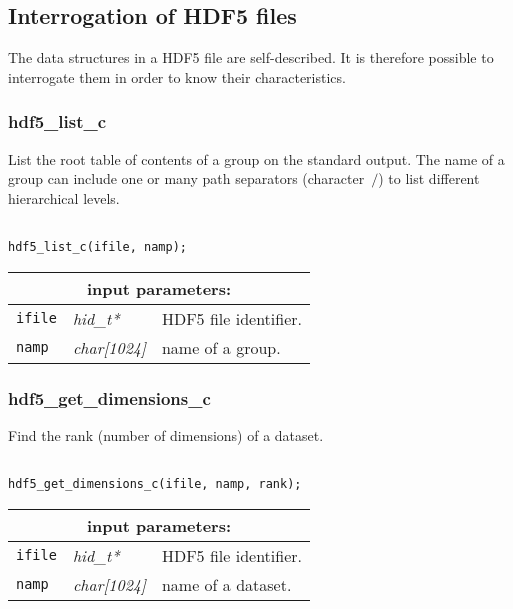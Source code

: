 \subsection{Interrogation of HDF5 files}

The data structures in a HDF5 file are self-described. It is therefore possible to interrogate them in order to know their characteristics.

\subsubsection{hdf5\_list\_c}

List the root table of contents of a group on the standard output. The name of a group can include one or many path separators (character~$\slash$)
to list different hierarchical levels.

\begin{verbatim}

hdf5_list_c(ifile, namp);
\end{verbatim}

\noindent
\begin{tabular}{|p{1.5cm}|p{2cm}|p{11cm}|}
\hline
\multicolumn{3}{|c|}{\bf input parameters:} \\
\hline
{\tt ifile} & {\it hid\_t*} & HDF5 file identifier. \\
\hline
{\tt namp} & {\it char[1024]} & name of a group. \\
\hline
\end{tabular}

\subsubsection{hdf5\_get\_dimensions\_c}

Find the rank (number of dimensions) of a dataset.

\begin{verbatim}

hdf5_get_dimensions_c(ifile, namp, rank);
\end{verbatim}

\noindent
\begin{tabular}{|p{1.5cm}|p{2cm}|p{11cm}|}
\hline
\multicolumn{3}{|c|}{\bf input parameters:} \\
\hline
{\tt ifile} & {\it hid\_t*} & HDF5 file identifier. \\
\hline
{\tt namp} & {\it char[1024]} & name of a dataset. \\
\hline
\end{tabular}

